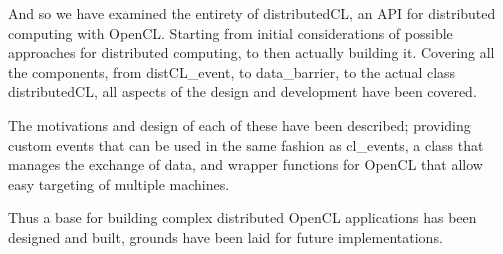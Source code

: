 \documentclass[../thesis.tex]{subfiles}
\begin{document}
And so we have examined the entirety of distributedCL, an API for distributed computing with OpenCL. Starting from initial considerations of possible approaches for distributed computing, to then actually building it. Covering all the components, from distCL\_event, to data\_barrier, to the actual class distributedCL, all aspects of the design and development have been covered.

The motivations and design of each of these have been described; providing custom events that can be used in the same fashion as cl\_events, a class that manages the exchange of data, and wrapper functions for OpenCL that allow easy targeting of multiple machines.

Thus a base for building complex distributed OpenCL applications has been designed and built, grounds have been laid for future implementations.
\end{document}
